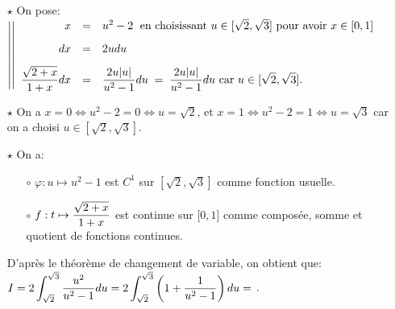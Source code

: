 \documentclass[a4paper, 11pt,reqno]{article}
\begin{document}
\begin{correction}
\begin{enumerate}
\begin{itemize}
\begin{itemize}
				            \item[$\star$] On pose: $\left| \left|\begin{array}{rll}
						                  x                             & = & u^2-2 \; \textmd{ en choisissant $u \in [\sqrt{2}, \sqrt{3}]$ pour avoir $x \in [0,1]$}\vsec              \\
						                  dx                            & = & 2udu \vsec                                                                                                \\
						                  \ddp\frac{\sqrt{2+x}}{1+x} dx & = & \ddp\frac{2u |u|}{u^2-1}du \; = \; \ddp\frac{2u |u|}{u^2-1}du \textmd{ car $u \in [\sqrt{2}, \sqrt{3}]$.}
					                  \end{array}\right.\right.$
				            \item[$\star$] On a $x=0 \Leftrightarrow  u^2-2 = 0  \Leftrightarrow  u=\sqrt{2}$, et $x=1 \Leftrightarrow  u^2-2 = 1  \Leftrightarrow  u=\sqrt{3}$ car on a choisi $u \in [\sqrt{2}, \sqrt{3}]$.
				            \item[$\star$] On a:
				                  \begin{itemize}
					                  \item[$\circ$] $\varphi: u\mapsto u^2-1$ est $C^1$ sur $\left\lbrack \sqrt{2},\sqrt{3} \right\rbrack$ comme fonction usuelle.
					                  \item[$\circ$] $f: t\mapsto   \displaystyle\frac{\sqrt{2+x}}{1+x} $ est continue sur $\lbrack 0,1\rbrack$ comme compos\'ee, somme et quotient de fonctions continues.
				                  \end{itemize}
				                  D'apr\`{e}s le th\'eor\`{e}me de changement de variable, on obtient que:
				                  $\displaystyle I=2\int_{\sqrt{2}}^{\sqrt{3}}  \displaystyle\frac{u^2}{u^2-1}du=2\int_{\sqrt{2}}^{\sqrt{3}}  \left( 1+\displaystyle\frac{1}{u^2-1}  \right)du =$
                      .
			            \end{itemize}
		      \end{itemize}
	\end{enumerate}
\end{correction}
\end{document}
